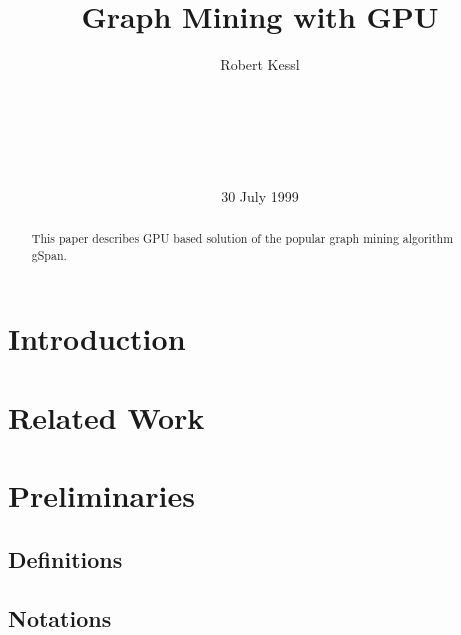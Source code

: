\documentclass{sigkddExp}
\begin{document}
\title{Graph Mining with GPU}


\author{
\alignauthor Robert Kessl \\
       \\
       \\
\\
       \\
       \\
}

\date{30 July 1999}
\maketitle

\begin{abstract}
This paper describes GPU based solution of the popular graph mining algorithm gSpan.
\end{abstract}











\section{Introduction}

\section{Related Work}

\section{Preliminaries}
\subsection{Definitions}
\subsection{Notations}
\end{document}
